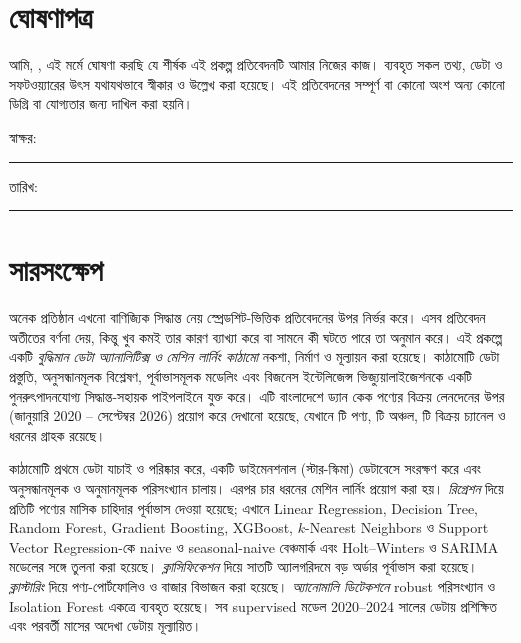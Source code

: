 \chapter*{ঘোষণাপত্র}
আমি, \StudentName, এই মর্মে ঘোষণা করছি যে \emph{\ProjectTitle} শীর্ষক এই প্রকল্প প্রতিবেদনটি আমার নিজের কাজ।
ব্যবহৃত সকল তথ্য, ডেটা ও সফটওয়্যারের উৎস যথাযথভাবে স্বীকার ও উল্লেখ করা হয়েছে। এই প্রতিবেদনের সম্পূর্ণ বা
কোনো অংশ অন্য কোনো ডিগ্রি বা যোগ্যতার জন্য দাখিল করা হয়নি।

\vspace{2cm}
\noindent স্বাক্ষর: \rule{6cm}{0.4pt}\hfill তারিখ: \rule{4cm}{0.4pt}

\chapter*{সারসংক্ষেপ}
অনেক প্রতিষ্ঠান এখনো বাণিজ্যিক সিদ্ধান্ত নেয় স্প্রেডশিট-ভিত্তিক প্রতিবেদনের উপর নির্ভর করে। এসব প্রতিবেদন অতীতের বর্ণনা দেয়,
কিন্তু খুব কমই তার কারণ ব্যাখ্যা করে বা সামনে কী ঘটতে পারে তা অনুমান করে। এই প্রকল্পে একটি \emph{বুদ্ধিমান ডেটা অ্যানালিটিক্স
ও মেশিন লার্নিং কাঠামো} নকশা, নির্মাণ ও মূল্যায়ন করা হয়েছে। কাঠামোটি ডেটা প্রস্তুতি, অনুসন্ধানমূলক বিশ্লেষণ, পূর্বাভাসমূলক
মডেলিং এবং বিজনেস ইন্টেলিজেন্স ভিজ্যুয়ালাইজেশনকে একটি পুনরুৎপাদনযোগ্য সিদ্ধান্ত-সহায়ক পাইপলাইনে যুক্ত করে। এটি
বাংলাদেশে ড্যান কেক পণ্যের \NRows বিক্রয় লেনদেনের উপর (জানুয়ারি 2020 -- সেপ্টেম্বর 2026) প্রয়োগ করে দেখানো হয়েছে, যেখানে
\NProducts টি পণ্য, \NRegions টি অঞ্চল, \NChannels টি বিক্রয় চ্যানেল ও \NCustTypes ধরনের গ্রাহক রয়েছে।

কাঠামোটি প্রথমে ডেটা যাচাই ও পরিষ্কার করে, একটি ডাইমেনশনাল (স্টার-স্কিমা) ডেটাবেসে সংরক্ষণ করে এবং অনুসন্ধানমূলক ও
অনুমানমূলক পরিসংখ্যান চালায়। এরপর চার ধরনের মেশিন লার্নিং প্রয়োগ করা হয়। \emph{রিগ্রেশন} দিয়ে প্রতিটি পণ্যের মাসিক চাহিদার
পূর্বাভাস দেওয়া হয়েছে; এখানে Linear Regression, Decision Tree, Random Forest, Gradient Boosting, XGBoost,
$k$-Nearest Neighbors ও Support Vector Regression-কে naive ও seasonal-naive বেঞ্চমার্ক এবং Holt--Winters ও SARIMA
মডেলের সঙ্গে তুলনা করা হয়েছে। \emph{ক্লাসিফিকেশন} দিয়ে সাতটি অ্যালগরিদমে বড় অর্ডার পূর্বাভাস করা হয়েছে। \emph{ক্লাস্টারিং}
দিয়ে পণ্য-পোর্টফোলিও ও বাজার বিভাজন করা হয়েছে। \emph{অ্যানোমালি ডিটেকশনে} robust পরিসংখ্যান ও Isolation Forest একত্রে
ব্যবহৃত হয়েছে। সব supervised মডেল 2020--2024 সালের ডেটায় প্রশিক্ষিত এবং পরবর্তী \TestMonths মাসের অদেখা ডেটায় মূল্যায়িত।

